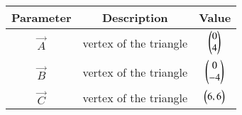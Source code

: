 \begin{center}
\begin{tabular}{|c|c|c|}
\hline
\textbf{Parameter}	&\textbf{Description}& \textbf{Value}\\ \hline
$\vec{A}	$ & vertex of the triangle &	$\begin{pmatrix}0\\4\end{pmatrix}$ 	\\ \hline
$\vec{B}	$ & vertex of the triangle &	$\begin{pmatrix}0\\-4\end{pmatrix}$	\\ \hline
$\vec{C}$ &vertex of the triangle  &	$\begin{pmatrix}6,6\end{pmatrix}$\\ \hline
\end{tabular}
\end{center}